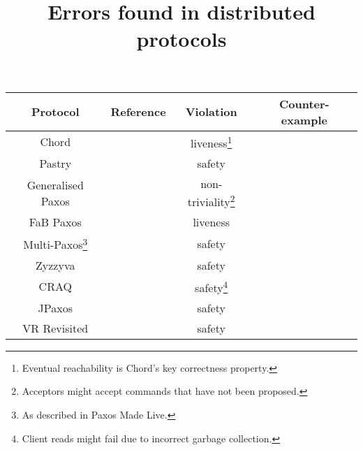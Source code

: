 \documentclass{article}
\title{Errors found in distributed protocols}
\date{}
\begin{document}
\maketitle

\begin{center}
\begin{tabular}{ c c c c }
    \toprule
    Protocol & Reference & Violation & Counter-example \\
    \midrule

    Chord & \cite{stoicaChordScalablePeertopeer2001,
    liben-nowellAnalysisEvolutionPeertopeer2002} &
    liveness\footnote{Eventual reachability is Chord's key
    correctness property.} & \cite{zaveUsingLightweightModeling2012,
    zaveReasoningIdentifierSpaces2017} \\

    Pastry & \cite{rowstronPastryScalableDecentralized2001} & safety &
    \cite{azmyRigorousCorrectnessProof2016, azmyMachinecheckedCorrectnessProof2018}\\

    Generalised Paxos & \cite{lamportGeneralizedConsensusPaxos2005} &
    non-triviality\footnote{Acceptors might accept commands that have not been
    proposed.} & \cite{sutraFastGenuineGeneralized2010} \\

    FaB Paxos & \cite{martinFastByzantineConsensus2005,
    martinFastByzantineConsensus2006} & liveness &
    \cite{abrahamRevisitingFastPractical2017} \\

    Multi-Paxos\footnote{As described in Paxos Made Live.} &
    \cite{chandraPaxosMadeLive2007} & safety &
    \cite{michaelRecoveringSharedObjects2017} \\

    Zyzzyva & \cite{kotlaZyzzyvaSpeculativeByzantine2007,
    kotlaZyzzyvaSpeculativeByzantine2009} & safety &
    \cite{abrahamRevisitingFastPractical2017} \\

    CRAQ & \cite{terraceObjectStorageCRAQ2009} & safety\footnote{Client reads
    might fail due to incorrect garbage collection.} &
    \cite{whittakerCRAQBug2020} \\

    JPaxos & \cite{konczakJPaxosStateMachine2011} & safety &
    \cite{michaelRecoveringSharedObjects2017} \\

    VR Revisited & \cite{liskovViewstampedReplicationRevisited2012} & safety &
    \cite{michaelRecoveringSharedObjects2017} \\


\end{tabular}
\end{center}
\end{document}
